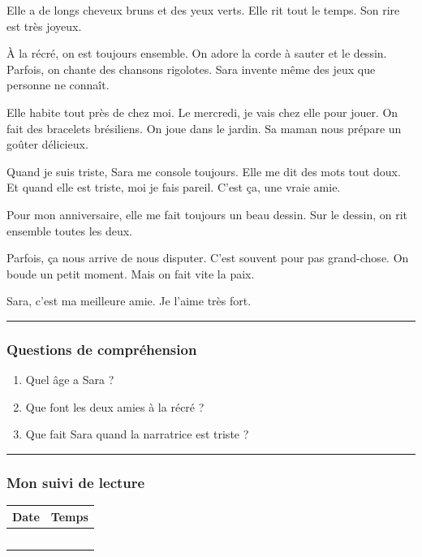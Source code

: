 \documentclass[
  french,
  14pt,
  a4paper,
]{extarticle}
\providecommand{\tightlist}{%
  \setlength{\itemsep}{0pt}\setlength{\parskip}{0pt}}
\begin{document}
Elle a de longs cheveux bruns et des yeux verts. Elle rit tout le temps.
Son rire est très joyeux.

À la récré, on est toujours ensemble. On adore la corde à sauter et le
dessin. Parfois, on chante des chansons rigolotes. Sara invente même des
jeux que personne ne connaît.

Elle habite tout près de chez moi. Le mercredi, je vais chez elle pour
jouer. On fait des bracelets brésiliens. On joue dans le jardin. Sa
maman nous prépare un goûter délicieux.

Quand je suis triste, Sara me console toujours. Elle me dit des mots
tout doux. Et quand elle est triste, moi je fais pareil. C'est ça, une
vraie amie.

Pour mon anniversaire, elle me fait toujours un beau dessin. Sur le
dessin, on rit ensemble toutes les deux.

Parfois, ça nous arrive de nous disputer. C'est souvent pour pas
grand-chose. On boude un petit moment. Mais on fait vite la paix.

Sara, c'est ma meilleure amie. Je l'aime très fort.

\newpage

\begin{center}\rule{0.5\linewidth}{0.5pt}\end{center}

\subsubsection{Questions de
compréhension}\label{questions-de-compruxe9hension-2}

\begin{enumerate}
\def\labelenumi{\arabic{enumi}.}
\tightlist
\item
  Quel âge a Sara ?
\item
  Que font les deux amies à la récré ?
\item
  Que fait Sara quand la narratrice est triste ?
\end{enumerate}

\begin{center}\rule{0.5\linewidth}{0.5pt}\end{center}

\subsubsection{Mon suivi de lecture}\label{mon-suivi-de-lecture-2}

\begin{center}
\begin{tabularx}{0.75\textwidth}{|X|X|}
\hline
\textbf{Date} & \textbf{Temps} \\
\hline
& \\
\hline
& \\
\hline
& \\
\hline
& \\
\hline
& \\
\hline
\end{tabularx}
\end{center}
\end{document}
